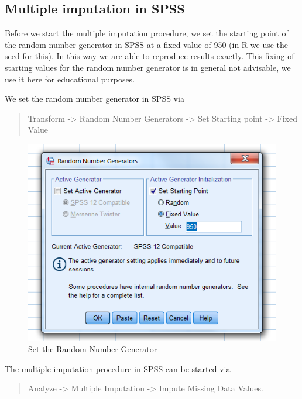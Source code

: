 \documentclass[]{book}
\begin{document}
\subsection{Multiple imputation in
SPSS}\label{multiple-imputation-in-spss-1}

Before we start the multiple imputation procedure, we set the starting
point of the random number generator in SPSS at a fixed value of 950 (in
R we use the seed for this). In this way we are able to reproduce
results exactly. This fixing of starting values for the random number
generator is in general not advisable, we use it here for educational
purposes.

We set the random number generator in SPSS via

\begin{quote}
Transform -\textgreater{} Random Number Generators -\textgreater{} Set
Starting point -\textgreater{} Fixed Value
\end{quote}

\begin{figure}

{\centering \includegraphics[width=0.9\linewidth]{images/fig4.5} 

}

\caption{Set the Random Number Generator }\label{fig:fig4-5}
\end{figure}

The multiple imputation procedure in SPSS can be started via

\begin{quote}
Analyze -\textgreater{} Multiple Imputation -\textgreater{} Impute
Missing Data Values.
\end{quote}
\end{document}
